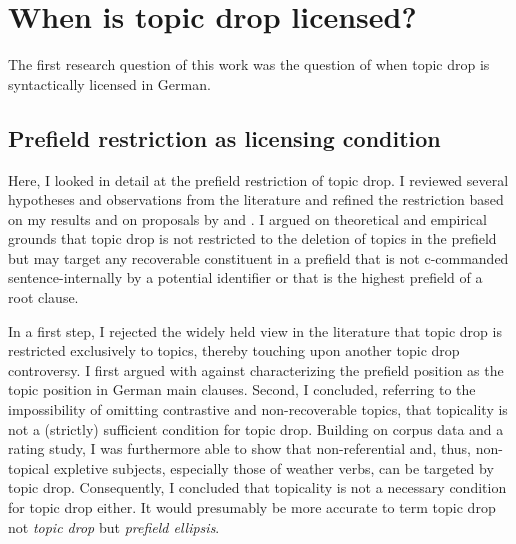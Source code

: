 \section{When is topic drop licensed?}
The first research question of this work was the question of when topic drop is syntactically licensed in German.

\subsection{Prefield restriction as licensing condition}
Here, I looked in detail at the prefield restriction of topic drop.
I reviewed several hypotheses and observations from the literature and refined the restriction based on my results and on proposals by \citet{rizzi1994} and \citet{freywald2020}.
I argued on theoretical and empirical grounds that topic drop is not restricted to the deletion of topics in the prefield but may target any recoverable  constituent in a prefield that is not c-commanded  sentence-internally by a potential identifier or that is the highest prefield of a root clause.

In a first step, I rejected the widely held view in the literature that topic drop is restricted exclusively to topics, thereby touching upon another topic drop controversy.
I first argued with \citet{frey2000} against characterizing the prefield position as the topic position in German main clauses.
Second, I concluded, referring to the impossibility of omitting contrastive and non-recoverable topics, that topicality is not a (strictly) sufficient condition for topic drop.
Building on corpus  data and a rating study, I was furthermore able to show that non-referential and, thus, non-topical expletive  subjects, especially those of weather verbs, can be targeted by topic drop.
Consequently, I concluded that topicality is not a necessary condition for topic drop either.
It would presumably be more accurate to term topic drop not \textit{topic drop} but \textit{prefield ellipsis}.

